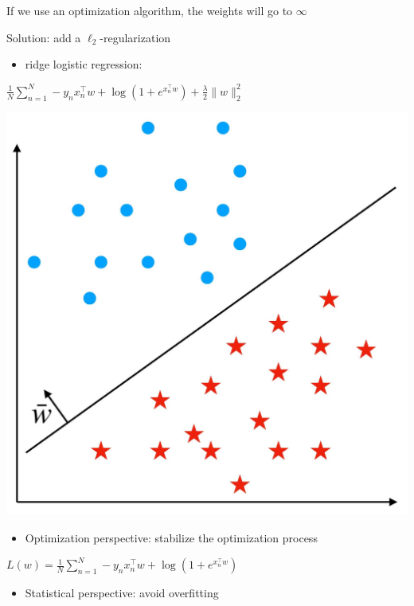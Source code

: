 \documentclass[10pt]{article}
\begin{document}
If we use an optimization algorithm, the weights will go to $\infty$

Solution: add a $\ell_{2}$-regularization

\begin{itemize}
  \item ridge logistic regression:
\end{itemize}

$\frac{1}{N} \sum_{n=1}^{N}-y_{n} x_{n}^{\top} w+\log \left(1+e^{x_{n}^{\top} w}\right)+\frac{\lambda}{2}\|w\|_{2}^{2}$

\begin{center}
\includegraphics[max width=\textwidth]{2023_12_30_261a5c67f471a6c49904g-24}
\end{center}

\begin{itemize}
  \item Optimization perspective: stabilize the optimization process
\end{itemize}

$L(w)=\frac{1}{N} \sum_{n=1}^{N}-y_{n} x_{n}^{\top} w+\log \left(1+e^{x_{n}^{\top} w}\right)$

\begin{itemize}
  \item Statistical perspective: avoid overfitting
\end{itemize}
\end{document}

